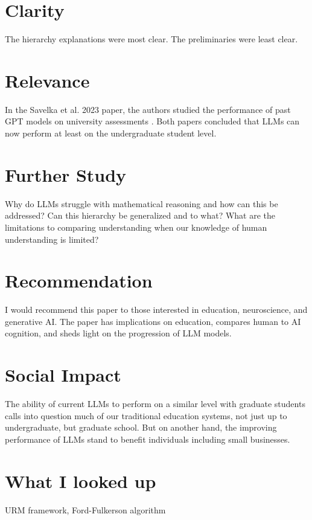 \documentclass[12pt, letterpaper]{article}
\begin{document}

\section{Clarity}
\label{sec:clarity}
The hierarchy explanations were most clear. The preliminaries were least clear.

\section{Relevance}
\label{sec:relevance}
In the Savelka et al. 2023 paper, the authors studied the performance of past GPT models on university assessments \cite{Savelka_2023}. Both papers concluded that LLMs can now perform at least on the undergraduate student level.

\section{Further Study}
\label{sec:further}
Why do LLMs struggle with mathematical reasoning and how can this be addressed? Can this hierarchy be generalized and to what? What are the limitations to comparing understanding when our knowledge of human understanding is limited?

\section{Recommendation}
\label{sec:rec}
I would recommend this paper to those interested in education, neuroscience, and generative AI. The paper has implications on education, compares human to AI cognition, and sheds light on the progression of LLM models.

\section{Social Impact}
\label{sec:impact}
The ability of current LLMs to perform on a similar level with graduate students calls into question much of our traditional education systems, not just up to undergraduate, but graduate school. But on another hand, the improving performance of LLMs stand to benefit individuals including small businesses.

\section{What I looked up}
\label{sec:looked up}
URM framework, Ford-Fulkerson algorithm


\end{document}
